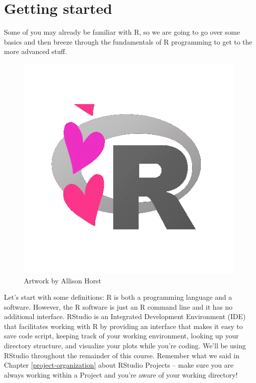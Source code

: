 \documentclass[
]{book}
\begin{document}
\hypertarget{getting-started}{%
\section{Getting started}\label{getting-started}}

Some of you may already be familiar with R, so we are going to go over some
basics and then breeze through the fundamentals of R programming to get to the
more advanced stuff.

\begin{figure}

{\centering \includegraphics[width=0.8\linewidth]{img/heartyr} 

}

\caption{Artwork by Allison Horst}\label{fig:lover}
\end{figure}

Let's start with some definitions: R is both a programming language and a
software. However, the R software is just an R command line and it has no
additional interface. RStudio is an Integrated Development Environment (IDE)
that facilitates working with R by providing an interface that makes it easy to
save code script, keeping track of your working environment, looking up your
directory structure, and visualize your plots while you're coding. We'll be
using RStudio throughout the remainder of this course. Remember what we said in
Chapter \ref{project-organization} about RStudio Projects -- make sure you are
always working within a Project and you're aware of your working directory!
\end{document}
